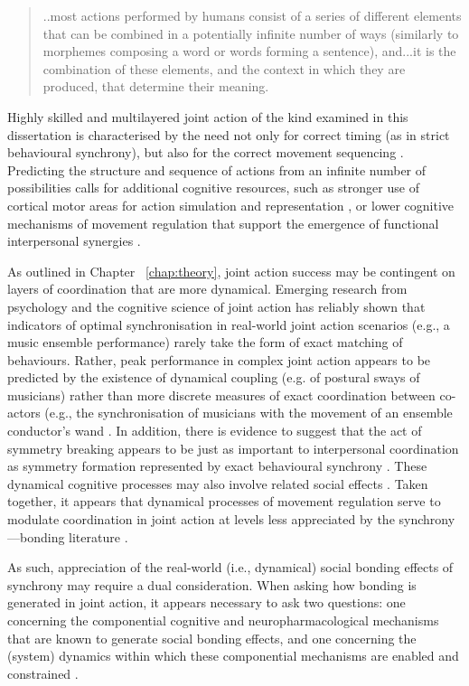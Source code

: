 \begin{quote}
    ..most actions performed by humans consist of a series of different elements that can be combined in a potentially infinite number of ways (similarly to morphemes composing a word or words forming a sentence), and...it is the combination of these elements, and the context in which they are produced, that determine their meaning.
\end{quote}

Highly skilled and multilayered joint action of the kind examined in this dissertation is characterised by the need not only for correct timing (as in strict behavioural synchrony), but also for the correct movement sequencing \citep{Palmer2003}.  Predicting the structure and sequence of actions from an infinite number of possibilities calls for additional cognitive resources, such as stronger use of cortical motor areas for action simulation and representation \citep{Bekkering2009}, or lower cognitive mechanisms of movement regulation that support the emergence of functional interpersonal synergies \citep{Riley2011}.

As outlined in Chapter ~\ref{chap:theory}, joint action success may be contingent on layers of coordination that are more dynamical.  Emerging research from psychology and the cognitive science of joint action has reliably shown that indicators of optimal synchronisation in real-world joint action scenarios (e.g., a music ensemble performance) rarely take the form of exact matching of behaviours.  Rather, peak performance in complex joint action appears to be predicted by the existence of dynamical coupling (e.g. of postural sways of musicians) rather than more discrete measures of exact coordination between co-actors (e.g., the synchronisation of musicians with the movement of an ensemble conductor's wand \citep{Miyata2017}. In addition, there is evidence to suggest that the act of symmetry breaking appears to be just as important to interpersonal coordination as symmetry formation represented by exact behavioural synchrony \citep{Richardson2015}.  These dynamical cognitive processes may also involve related social effects \citep{Marsh2009}.  Taken together, it appears that dynamical processes of movement regulation serve to modulate coordination in joint action at levels less appreciated by the synchrony—bonding literature \citep{Launay2016}.

As such, appreciation of the real-world (i.e., dynamical) social bonding effects of synchrony may require a dual consideration.   When asking how bonding is generated in joint action, it appears necessary to ask two questions:
one concerning the componential cognitive and neuropharmacological mechanisms that are known to generate social bonding effects, and one concerning the (system) dynamics within which these componential mechanisms are enabled and constrained \citep{Coey2012}.

